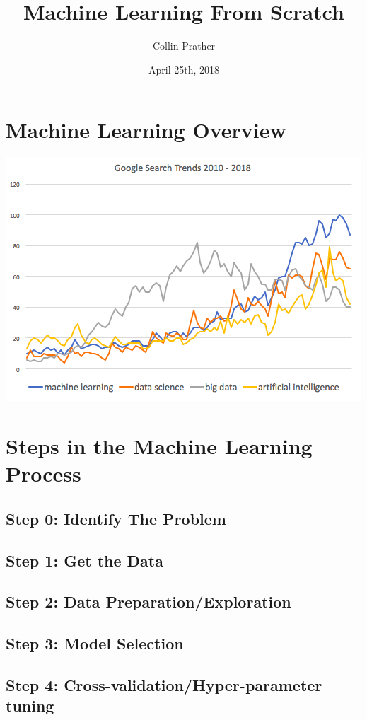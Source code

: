 \documentclass{beamer}
\title{Machine Learning From Scratch}
\author{Collin Prather}
\date{April 25th, 2018}
\begin{document}
	
\frame{\titlepage}
\section{Machine Learning Overview}
\frame{\tableofcontents[currentsection]}

\begin{frame}
\begin{center}
	\includegraphics[scale=.55]{Figures/google_trends}
\end{center}
\end{frame}

\section{Steps in the Machine Learning Process}

\subsection{Step 0: Identify The Problem}

\subsection{Step 1: Get the Data}


\subsection{Step 2: Data Preparation/Exploration}


\subsection{Step 3: Model Selection}


\subsection{Step 4: Cross-validation/Hyper-parameter tuning}
\end{document}
